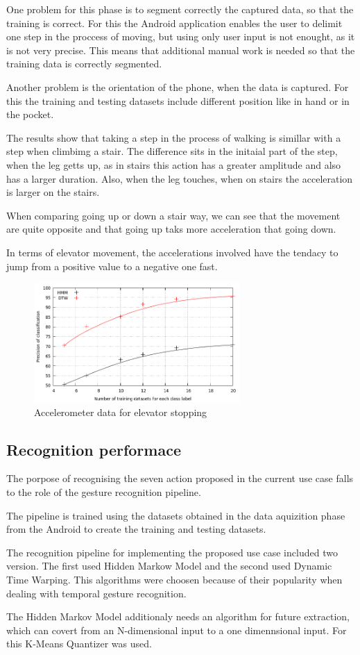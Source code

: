 One problem for this phase is to segment correctly the captured data, so that the training is correct. For this the Android application enables the user to delimit one step in the proccess of moving, but using only user input is not enought, as it is not very precise. This means that additional manual work is needed so that the training data is correctly segmented.

Another problem is the orientation of the phone, when the data is captured. For this the training and testing datasets include different position like in hand or in the pocket.

The results show that taking a step in the process of walking is simillar with a step when climbimg a stair. The difference sits in the initaial part of the step, when the leg getts up, as in stairs this action has a greater amplitude and also has a larger duration. Also, when the leg touches, when on stairs the acceleration is larger on the stairs.

When comparing going up or down a stair way, we can see that the movement are quite opposite and that going up taks more acceleration that going down.

In terms of elevator movement, the accelerations involved have the tendacy to jump from a positive value to a negative one fast.

\begin{figure}
    \centering
    \includegraphics[width=0.7\textwidth]{src/img/comp-HMM-DTW.png}
    \caption{Accelerometer data for elevator stopping}
    \label{fig:comp-HMM-DTW}
\end{figure}


\subsection{Recognition performace}
The porpose of recognising the seven action proposed in the current use case falls to the role of the gesture recognition pipeline.

The pipeline is trained using the datasets obtained in the data aquizition phase from the Android to create the training and testing datasets.

The recognition pipeline for implementing the proposed use case included two version. The first used Hidden Markow Model and the second used Dynamic Time Warping. This algorithms were choosen because of their popularity when dealing with temporal gesture recognition.

The Hidden Markov Model additionaly needs an algorithm for future extraction, which can covert from an N-dimensional input to a one dimennsional input. For this K-Means Quantizer was used.
